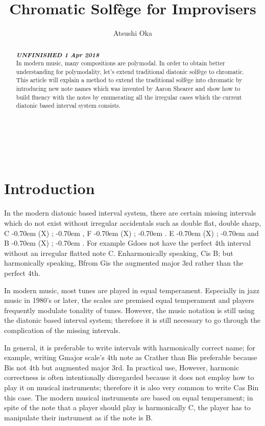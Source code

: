\documentclass[a4paper]{article}
\title{Chromatic Solfège for Improvisers}
\author{Atsushi Oka}
\date{}
\def\slant#1#2{%
	\tikz[baseline=(X.base), xslant=tan(#1)]
	\node[inner sep=0pt, xslant=tan(#1)](X){#2};%
}
\def \caccidental#1{%
	\kern -0.70em \slant{15}{%
		\textsuperscript{ \scalebox{.9}{ #1 } }%
	}%
	\kern -0.70em %
}
\def \csharp {%
	\caccidental{ \sharp }%
}
\def \cflat{%
	\caccidental{ \flat  }%
}
\begin{document}
\maketitle

\begin{abstract}
	\textbf{\textit{ UNFINISHED 1 Apr 2018 }} \\
	
In modern music, many compositions are polymodal. In order to obtain better understanding for polymodality, let’s extend traditional diatonic solfège to chromatic. This article will explain a method to extend the traditional solfège into chromatic by introducing new note names which was invented by Aaron Shearer and show how to build fluency with the notes by enumerating all the irregular cases which the current diatonic based interval system consists.
\end{abstract}

~\\

~\\

\section{Introduction}

In the modern diatonic based interval system, there are certain missing intervals which do not exist without irregular accidentals such as double flat, double sharp, C\cflat , F\cflat. E\csharp and B\csharp. For example G\flat does not have the perfect 4th interval without an irregular flatted note C\flat.  Enharmonically speaking, C\flat is B\natural; but harmonically speaking, B\natural from G\flat is the augmented major 3rd rather than the perfect 4th. 

In modern music, most tunes are played in equal temperament. Especially in jazz music in 1980’s or later, the scales are premised equal temperament and players frequently modulate tonality of tunes. However, the music notation is still using the diatonic based interval system; therefore it is still necessary to go through the complication of the missing intervals.

In general, it is preferable to write intervals with harmonically correct name; for example, writing G\flat major scale’s 4th note as C\flat rather than B\natural is preferable because B\natural is not 4th but augmented major 3rd. In practical use,  However, harmonic correctness is often intentionally disregarded because it does not employ how to play it on musical instruments; therefore it is also very common to write C\flat as B\natural in this case. The modern musical instruments are based on equal temperament; in spite of the note that a player should play is harmonically C\flat, the player has to manipulate their instrument as if the note is B\natural.
\end{document}

